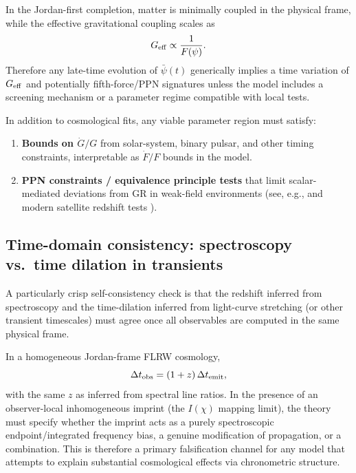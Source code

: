 \documentclass[10pt]{article}
\begin{document}
In the Jordan-first completion, matter is minimally coupled in the physical frame, while the
effective gravitational coupling scales as
\begin{equation}
G_{\rm eff} \propto \frac{1}{F(\psi)}.
\end{equation}
Therefore any late-time evolution of \(\bar\psi(t)\) generically implies a time variation of
\(G_{\rm eff}\) and potentially fifth-force/PPN signatures unless the model includes a screening
mechanism or a parameter regime compatible with local tests.

In addition to cosmological fits, any viable parameter region must satisfy:
\begin{enumerate}[leftmargin=1.2em]
\item \textbf{Bounds on \(\dot G/G\)} from solar-system, binary pulsar, and other timing constraints,
interpretable as \(\dot F/F\) bounds in the model.
\item \textbf{PPN constraints / equivalence principle tests} that limit scalar-mediated deviations
from GR in weak-field environments (see, e.g., \cite{Will2014LRR} and modern satellite redshift tests
\cite{Delva2018Galileo,Herrmann2018Galileo}).
\end{enumerate}

\subsection{Time-domain consistency: spectroscopy vs.\ time dilation in transients}
\label{sec:constraints_timedomain}

A particularly crisp self-consistency check is that the redshift inferred from spectroscopy and the
time-dilation inferred from light-curve stretching (or other transient timescales) must agree once
all observables are computed in the same physical frame.

In a homogeneous Jordan-frame FLRW cosmology,
\begin{equation}
\Delta t_{\rm obs} = (1+z)\,\Delta t_{\rm emit},
\end{equation}
with the same \(z\) as inferred from spectral line ratios. In the presence of an observer-local
inhomogeneous imprint (the \(I(\chi)\) mapping limit), the theory must specify whether the imprint
acts as a purely spectroscopic endpoint/integrated frequency bias, a genuine modification of
propagation, or a combination. This is therefore a primary falsification channel for any model that
attempts to explain substantial cosmological effects via chronometric structure.
\end{document}
